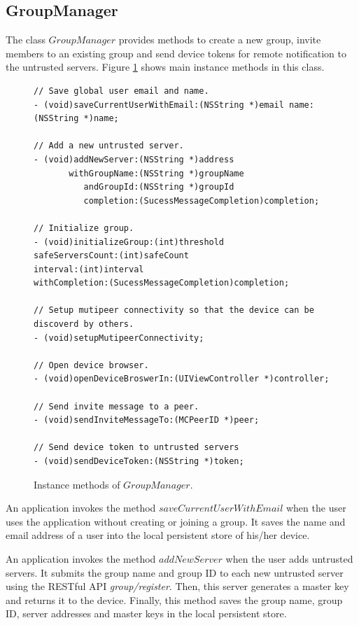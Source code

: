 \documentclass[a4paper,11pt]{report}
\begin{document}
\subsection{GroupManager}

The class $GroupManager$ provides methods to create a new group, invite members to an existing group and send device tokens for remote notification to the untrusted servers.
Figure \ref{fig:group_manager} shows main instance methods in this class.

\begin{figure}
\begin{lstlisting}[frame=none language=Objective-C] 
// Save global user email and name.
- (void)saveCurrentUserWithEmail:(NSString *)email name:(NSString *)name;

// Add a new untrusted server.
- (void)addNewServer:(NSString *)address
       withGroupName:(NSString *)groupName
          andGroupId:(NSString *)groupId
          completion:(SucessMessageCompletion)completion;

// Initialize group.
- (void)initializeGroup:(int)threshold
safeServersCount:(int)safeCount
interval:(int)interval
withCompletion:(SucessMessageCompletion)completion;

// Setup mutipeer connectivity so that the device can be discoverd by others.
- (void)setupMutipeerConnectivity;

// Open device browser.
- (void)openDeviceBroswerIn:(UIViewController *)controller;

// Send invite message to a peer.
- (void)sendInviteMessageTo:(MCPeerID *)peer;

// Send device token to untrusted servers
- (void)sendDeviceToken:(NSString *)token;	
\end{lstlisting}
\caption{Instance methods of $GroupManager$.}
\label{fig:group_manager}
\end{figure}

An application invokes the method $saveCurrentUserWithEmail$ when the user uses the application without creating or joining a group.
It saves the name and email address of a user into the local persistent store of his/her device.

An application invokes the method $addNewServer$ when the user adds untrusted servers. 
It submits the group name and group ID to each new untrusted server using the RESTful API \emph{group/register}.
Then, this server generates a master key and returns it to the device.
Finally, this method saves the group name, group ID, server addresses and master keys in the local persistent store.
\end{document}
